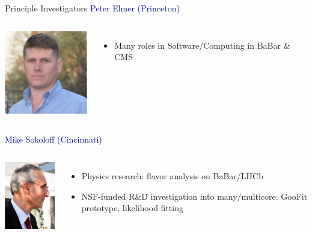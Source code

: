 \documentclass{beamer}
\begin{document}
\begin{frame}{Principle Investigators}
\hspace{-0.6 cm}\textcolor{darkblue}{\large Peter Elmer (Princeton)}

\vspace{0.25 cm}
\begin{columns}
\includegraphics[height=2 cm]{peter_elmer.png}

\begin{itemize}
\item Many roles in Software/Computing in BaBar \& CMS
\end{itemize}
\end{columns}

\vspace{1 cm}
\hspace{-0.6 cm}\textcolor{darkblue}{\large Mike Sokoloff (Cincinnati)}

\vspace{0.25 cm}
\begin{columns}
\includegraphics[height=2 cm]{mike_sokoloff.png}

\begin{itemize}
\item Physics research: flavor analysis on BaBar/LHCb
\item NSF-funded R\&D investigation into many/multicore: GooFit prototype, likelihood fitting
\end{itemize}
\end{columns}
\end{frame}
\end{document}
